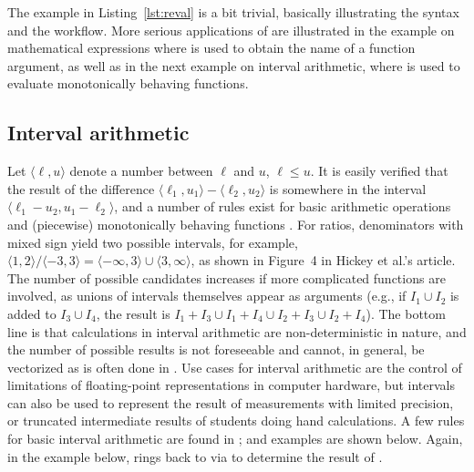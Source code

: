 \documentclass[article]{jss}
\begin{document}
The example in Listing~\ref{lst:reval} is a bit trivial, basically illustrating
the syntax and the workflow. More serious applications of  are
illustrated in the example on mathematical expressions where  is
used to obtain the name of a function argument, as well as in the next example
on interval arithmetic, where  is used to evaluate monotonically
behaving  functions.

\subsection{Interval arithmetic}

Let $\langle\ell, u\rangle$ denote a number between $\ell$ and $u$, $\ell\le u$.
It is easily verified that the result of the
difference $\langle\ell_1, u_1\rangle - \langle\ell_2, u_2\rangle$ is somewhere
in the interval $\langle \ell_1 - u_2, u_1 - \ell_2\rangle$, and a number of
rules exist for basic arithmetic operations and (piecewise) monotonically
behaving functions \citep{Hickey2001}. For ratios, denominators with mixed sign
yield two possible intervals, for example,
$\langle 1, 2\rangle / \langle -3, 3\rangle = \langle -\infty, 3\rangle \cup \langle 3, \infty\rangle$,
as shown in Figure~4 in Hickey et al.'s article. The number of possible
candidates increases if more complicated functions are involved, as unions of
intervals themselves appear as arguments (e.g., if $I_1 \cup I_2$ is added
to $I_3 \cup I_4$, the result
is $I_1 + I_3 \cup I_1 + I_4 \cup I_2 + I_3 \cup I_2 + I_4$). The bottom line is
that calculations in interval arithmetic are non-deterministic in nature, and
the number of possible results is not foreseeable and cannot, in general, be
vectorized as is often done in . Use cases for interval arithmetic
are the control of limitations of floating-point representations in computer
hardware, but intervals can also be used to represent the result of measurements
with limited precision, or truncated intermediate results of students doing hand
calculations. A few rules for basic interval arithmetic are found
in ; and examples are shown below. Again, in the example
below,  rings back to  via  to
determine the result of .
\end{document}
